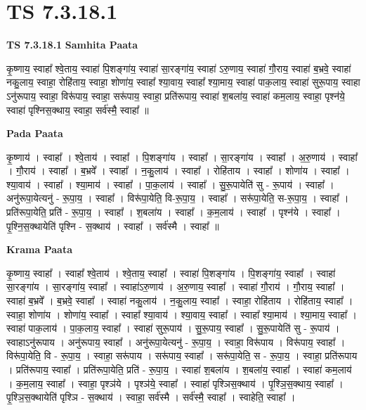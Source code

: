 \documentclass[17pt]{extarticle}
\begin{document}
\section{ TS 7.3.18.1 }

\textbf{TS 7.3.18.1 } \newline
\textbf{Samhita Paata} \newline

कृ॒ष्णाय॒ स्वाहा᳚ श्वे॒ताय॒ स्वाहा॑ पि॒शङ्गा॑य॒ स्वाहा॑ सा॒रङ्गा॑य॒ स्वाहा॑ ऽरु॒णाय॒ स्वाहा॑ गौ॒राय॒ स्वाहा॑ ब॒भ्रवे॒ स्वाहा॑ नकु॒लाय॒ स्वाहा॒ रोहि॑ताय॒ स्वाहा॒ शोणा॑य॒ स्वाहा᳚ श्या॒वाय॒ स्वाहा᳚ श्या॒माय॒ स्वाहा॑ पाक॒लाय॒ स्वाहा॑ सुरू॒पाय॒ स्वाहा ऽनु॑रूपाय॒ स्वाहा॒ विरू॑पाय॒ स्वाहा॒ सरू॑पाय॒ स्वाहा॒ प्रति॑रूपाय॒ स्वाहा॑ श॒बला॑य॒ स्वाहा॑ कम॒लाय॒ स्वाहा॒ पृश्न॑ये॒ स्वाहा॑ पृश्निस॒क्थाय॒ स्वाहा॒ सर्व॑स्मै॒ स्वाहा᳚ ॥ \newline

\textbf{Pada Paata} \newline

कृ॒ष्णाय॑ । स्वाहा᳚ । श्वे॒ताय॑ । स्वाहा᳚ । पि॒शङ्गा॑य । स्वाहा᳚ । सा॒रङ्गा॑य । स्वाहा᳚ । अ॒रु॒णाय॑ । स्वाहा᳚ । गौ॒राय॑ । स्वाहा᳚ । ब॒भ्रवे᳚ । स्वाहा᳚ । न॒कु॒लाय॑ । स्वाहा᳚ । रोहि॑ताय । स्वाहा᳚ । शोणा॑य । स्वाहा᳚ । श्या॒वाय॑ । स्वाहा᳚ । श्या॒माय॑ । स्वाहा᳚ । पा॒क॒लाय॑ । स्वाहा᳚ । सु॒रू॒पायेति॑ सु - रू॒पाय॑ । स्वाहा᳚ । अनु॑रूपा॒येत्यनु॑ - रू॒पा॒य॒ । स्वाहा᳚ । विरू॑पा॒येति॒ वि-रू॒पा॒य॒ । स्वाहा᳚ । सरू॑पा॒येति॒ स-रू॒पा॒य॒ । स्वाहा᳚ । प्रति॑रूपा॒येति॒ प्रति॑ - रू॒पा॒य॒ । स्वाहा᳚ । श॒बला॑य । स्वाहा᳚ । क॒म॒लाय॑ । स्वाहा᳚ । पृश्न॑ये । स्वाहा᳚ । पृ॒श्नि॒स॒क्थायेति॑ पृश्नि - स॒क्थाय॑ । स्वाहा᳚ । सर्व॑स्मै । स्वाहा᳚ ॥  \newline


\textbf{Krama Paata} \newline

कृ॒ष्णाय॒ स्वाहा᳚ । स्वाहा᳚ श्वे॒ताय॑ । श्वे॒ताय॒ स्वाहा᳚ । स्वाहा॑ पि॒शङ्‍गा॑य । पि॒शङ्‍गा॑य॒ स्वाहा᳚ । स्वाहा॑ सा॒रङ्‍गा॑य । सा॒रङ्‍गा॑य॒ स्वाहा᳚ । स्वाहा॑ऽरु॒णाय॑ । अ॒रु॒णाय॒ स्वाहा᳚ । स्वाहा॑ गौ॒राय॑ । गौ॒राय॒ स्वाहा᳚ । स्वाहा॑ ब॒भ्रवे᳚ । ब॒भ्रवे॒ स्वाहा᳚ । स्वाहा॑ नकु॒लाय॑ । न॒कु॒लाय॒ स्वाहा᳚ । स्वाहा॒ रोहि॑ताय । रोहि॑ताय॒ स्वाहा᳚ । स्वाहा॒ शोणा॑य । शोणा॑य॒ स्वाहा᳚ । स्वाहा᳚ श्या॒वाय॑ । श्या॒वाय॒ स्वाहा᳚ । स्वाहा᳚ श्या॒माय॑ । श्या॒माय॒ स्वाहा᳚ । स्वाहा॑ पाक॒लाय॑ । पा॒क॒लाय॒ स्वाहा᳚ । स्वाहा॑ सुरू॒पाय॑ । सु॒रू॒पाय॒ स्वाहा᳚ । सु॒रू॒पायेति॑ सु - रू॒पाय॑ । स्वाहाऽनु॑रूपाय । अनु॑रूपाय॒ स्वाहा᳚ । अनु॑रूपा॒येत्यनु॑ - रू॒पा॒य॒ । स्वाहा॒ विरू॑पाय । विरू॑पाय॒ स्वाहा᳚ । विरू॑पा॒येति॒ वि - रू॒पा॒य॒ । स्वाहा॒ सरू॑पाय । सरू॑पाय॒ स्वाहा᳚ । सरू॑पा॒येति॒ स - रू॒पा॒य॒ । स्वाहा॒ प्रति॑रूपाय । प्रति॑रूपाय॒ स्वाहा᳚ । प्रति॑रूपा॒येति॒ प्रति॑ - रू॒पा॒य॒ । स्वाहा॑ श॒बला॑य । श॒बला॑य॒ स्वाहा᳚ । स्वाहा॑ कम॒लाय॑ । क॒म॒लाय॒ स्वाहा᳚ । स्वाहा॒ पृश्ञ॑ये । पृश्ञ॑ये॒ स्वाहा᳚ । स्वाहा॑ पृश्ञिस॒क्थाय॑ । पृ॒श्ञि॒स॒क्थाय॒ स्वाहा᳚ । पृ॒श्ञि॒स॒क्थायेति॑ पृश्ञि - स॒क्थाय॑ । स्वाहा॒ सर्व॑स्मै । सर्व॑स्मै॒ स्वाहा᳚ । स्वाहेति॒ स्वाहा᳚ । \newline
\end{document}
